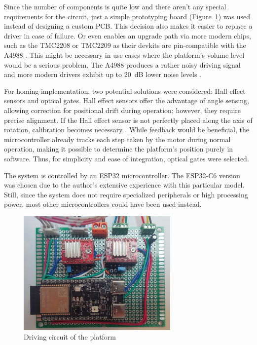Since the number of components is quite low and there aren't any special requirements for the circuit, just a simple prototyping board  (Figure~\ref{fig:circuit}) was used instead of designing a custom PCB.
This decision also makes it easier to replace a driver in case of failure.
Or even enables an upgrade path via more modern chips, such as the TMC2208 or TMC2209 as their devkits are pin-compatible with the A4988 \cite{a4988_sound}.
This might be necessary in use cases where the platform's volume level would be a serious problem.
The A4988 produces a rather noisy driving signal and more modern drivers exhibit up to 20~dB lower noise levels \cite{a4988_sound}.

For homing implementation, two potential solutions were considered: Hall effect sensors and optical gates.
Hall effect sensors offer the advantage of angle sensing, allowing correction for positional drift during operation; however, they require precise alignment.
If the Hall effect sensor is not perfectly placed along the axis of rotation, calibration becomes necessary \cite{hall}.
While feedback would be beneficial, the microcontroller already tracks each step taken by the motor during normal operation, making it possible to determine the platform's position purely in software.
Thus, for simplicity and ease of integration, optical gates were selected.

The system is controlled by an ESP32 microcontroller.
The ESP32-C6 version was chosen due to the author's extensive experience with this particular model.
Still, since the system does not require specialized peripherals or high processing power, most other microcontrollers could have been used instead.

\begin{figure}[h!]
	\centering
\includegraphics[width=0.7\textwidth]{../img/circuit.jpg}
	\caption[Driving circuit of the platform]{Driving circuit of the platform}
	\label{fig:circuit}
\end{figure}

